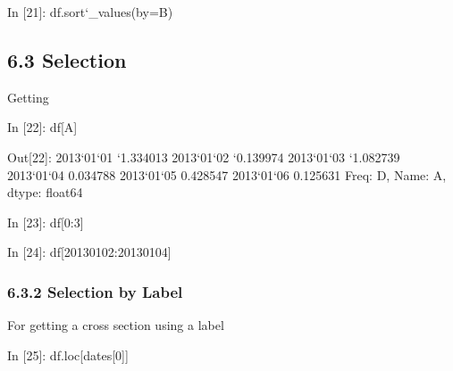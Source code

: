 \documentclass[letterpaper,10pt,english]{sphinxmanual}
\def\PYGZus{\char`\_}
\def\PYGZhy{\char`\-}
\def\PYGZsq{\char`\'}
\renewcommand\PYGZsq{\textquotesingle}
\begin{document}
\begin{OriginalVerbatim}[commandchars=\\\{\}]
\textcolor{nbsphinxin}{In [21]: }df.sort\PYGZus{}values(by=\PYGZsq{}B\PYGZsq{})
\end{OriginalVerbatim}


\subsection{6.3 Selection}
\label{pandas_quickstart:6.3-Selection}
Getting

\begin{OriginalVerbatim}[commandchars=\\\{\}]
\textcolor{nbsphinxin}{In [22]: }df[\PYGZsq{}A\PYGZsq{}]
\end{OriginalVerbatim}

\begin{OriginalVerbatim}[commandchars=\\\{\}]
\textcolor{nbsphinxout}{Out[22]: }2013\PYGZhy{}01\PYGZhy{}01   \PYGZhy{}1.334013
         2013\PYGZhy{}01\PYGZhy{}02   \PYGZhy{}0.139974
         2013\PYGZhy{}01\PYGZhy{}03   \PYGZhy{}1.082739
         2013\PYGZhy{}01\PYGZhy{}04    0.034788
         2013\PYGZhy{}01\PYGZhy{}05    0.428547
         2013\PYGZhy{}01\PYGZhy{}06    0.125631
         Freq: D, Name: A, dtype: float64
\end{OriginalVerbatim}

\begin{OriginalVerbatim}[commandchars=\\\{\}]
\textcolor{nbsphinxin}{In [23]: }df[0:3]
\end{OriginalVerbatim}

\begin{OriginalVerbatim}[commandchars=\\\{\}]
\textcolor{nbsphinxin}{In [24]: }df[\PYGZsq{}20130102\PYGZsq{}:\PYGZsq{}20130104\PYGZsq{}]
\end{OriginalVerbatim}


\subsubsection{6.3.2 Selection by Label}
\label{pandas_quickstart:6.3.2-Selection-by-Label}
For getting a cross section using a label

\begin{OriginalVerbatim}[commandchars=\\\{\}]
\textcolor{nbsphinxin}{In [25]: }df.loc[dates[0]]
\end{OriginalVerbatim}
\end{document}

